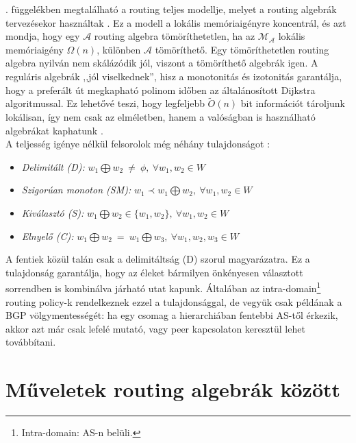    . függelékben megtalálható a routing teljes modellje, melyet a routing algebrák tervezésekor használtak \cite{Sobrinho_Network_routing}. Ez a modell a lokális memóriaigényre koncentrál, és azt mondja, hogy egy $\mathcal{A}$ routing algebra tömöríthetetlen, ha az $\mathcal{M_{\mathcal{A}}}$ lokális memóriaigény $\Omega(n)$, különben $\mathcal{A}$ tömöríthető. Egy tömöríthetetlen routing algebra nyilván nem skálázódik jól, viszont a tömöríthető algebrák igen. A reguláris algebrák ,,jól viselkednek'', hisz a monotonitás és izotonitás garantálja, hogy a preferált út megkapható polinom időben az általánosított Dijkstra algoritmussal. Ez lehetővé teszi, hogy legfeljebb $\tilde{O}(n)$ bit információt tároljunk lokálisan, így nem csak az elméletben, hanem a valóságban is használható algebrákat kaphatunk \cite{Sobrinho_Network_routing, Sobrinho_Metarouting}.\\

    A teljesség igénye nélkül felsorolok még néhány tulajdonságot \cite{Lexicographic_products_in_metarouting}:
    \begin{itemize}
      \item \emph{ Delimitált (D):} $w_{1} \bigoplus w_{2} ~\neq~\phi, ~\forall w_{1}, w_{2} \in W$
      \item \emph{ Szigorúan monoton (SM):} $w_{1} \prec w_{1} \bigoplus w_{2}, ~\forall w_{1}, w_{2} \in W$
      \item \emph{ Kiválasztó (S):} $w_{1} \bigoplus w_{2} \in \{w_{1}, w_{2}\}, ~\forall w_{1}, w_{2} \in W$
      \item \emph{ Elnyelő (C):} $w_{1} \bigoplus w_{2} ~=~ w_{1} \bigoplus w_{3}, ~\forall w_{1}, w_{2}, w_{3} \in W$
    \end{itemize}

    A fentiek közül talán csak a delimitáltság (D) szorul magyarázatra. Ez a tulajdonság garantálja, hogy az éleket bármilyen önkényesen választott sorrendben is kombinálva járható utat kapunk. Általában az intra-domain\footnote{Intra-domain: AS-n belüli.} routing policy-k rendelkeznek ezzel a tulajdonsággal, de vegyük csak példának a BGP völgymentességét: ha egy csomag a hierarchiában fentebbi AS-től érkezik, akkor azt már csak lefelé mutató, vagy peer kapcsolaton keresztül lehet továbbítani.

  \section{Műveletek routing algebrák között}\label{section_algebramuveletek}

